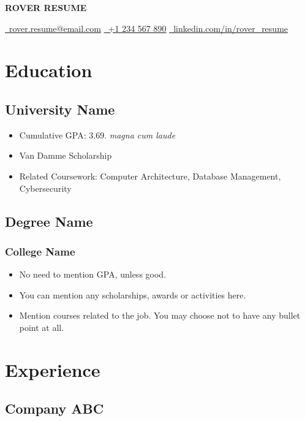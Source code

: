 \documentclass[11pt]{article}
\begin{document}
\begin{center}
  {\Huge\bfseries\uppercase{Rover Resume}} \\ \medskip

  \href{mailto:youremail@example.com}{\faEnvelope\ rover.resume@email.com} \quad
  \href{tel:1234567890}{\faPhone\ +1 234 567 890} \quad
  \href{https://www.linkedin.com}{\faLinkedin\ linkedin.com/in/rover\_resume}
\end{center}


\section{Education}
\subsection{University Name  }
\begin{itemize}
	\item Cumulative GPA: 3.69. \textit{magna cum laude} 
	\item Van Damme Scholarship
  \item Related Coursework: Computer Architecture, Database Management, Cybersecurity
\end{itemize}

\subsection{Degree Name }
\subsubsection{College Name }
\begin{itemize}
	\item No need to mention GPA, unless good.
	\item You can mention any scholarships, awards or activities here.
  \item Mention courses related to the job. You may choose not to have any bullet point at all.
\end{itemize}


\section{Experience}
\subsection{Company ABC }
\end{document}
